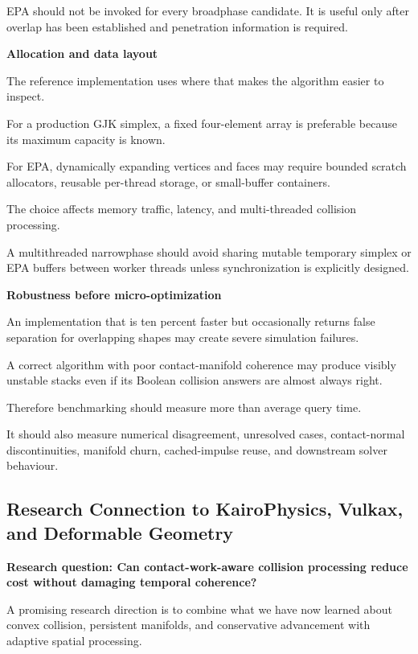 EPA should not be invoked for every broadphase candidate. It is useful only after overlap has been established and penetration information is required.

\textbf{Allocation and data layout}

The reference implementation uses  where that makes the algorithm easier to inspect.

For a production GJK simplex, a fixed four-element array is preferable because its maximum capacity is known.

For EPA, dynamically expanding vertices and faces may require bounded scratch allocators, reusable per-thread storage, or small-buffer containers.

The choice affects memory traffic, latency, and multi-threaded collision processing.

A multithreaded narrowphase should avoid sharing mutable temporary simplex or EPA buffers between worker threads unless synchronization is explicitly designed.

\textbf{Robustness before micro-optimization}

An implementation that is ten percent faster but occasionally returns false separation for overlapping shapes may create severe simulation failures.

A correct algorithm with poor contact-manifold coherence may produce visibly unstable stacks even if its Boolean collision answers are almost always right.

Therefore benchmarking should measure more than average query time.

It should also measure numerical disagreement, unresolved cases, contact-normal discontinuities, manifold churn, cached-impulse reuse, and downstream solver behaviour.

\subsection{Research Connection to KairoPhysics, Vulkax, and Deformable Geometry}\label{04-visual-computing-ii-ch026-research-connection-to-kairophysics-vulkax-and-deformable-geometry}

\hypertarget{04-visual-computing-ii-ch026-research-connection-to-kairophysics-vulkax-and-deformable-geometry}{}

\textbf{Research question: Can contact-work-aware collision processing reduce cost without damaging temporal coherence?}

A promising research direction is to combine what we have now learned about convex collision, persistent manifolds, and conservative advancement with adaptive spatial processing.

